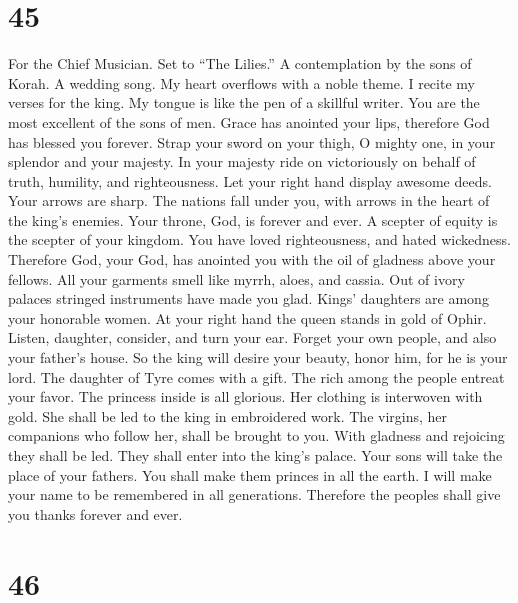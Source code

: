 \hypertarget{section-44}{%
\section{45}\label{section-44}}

For the Chief Musician. Set to ``The Lilies.'' A contemplation by the
sons of Korah. A wedding song.  My heart overflows with a
noble theme. I recite my verses for the king. My tongue is like the pen
of a skillful writer.  You are the most excellent of the
sons of men. Grace has anointed your lips, therefore God has blessed you
forever.  Strap your sword on your thigh, O mighty one, in
your splendor and your majesty.  In your majesty ride on
victoriously on behalf of truth, humility, and righteousness. Let your
right hand display awesome deeds.  Your arrows are sharp.
The nations fall under you, with arrows in the heart of the king's
enemies.  Your throne, God, is forever and ever. A scepter
of equity is the scepter of your kingdom.  You have loved
righteousness, and hated wickedness. Therefore God, your God, has
anointed you with the oil of gladness above your fellows. 
All your garments smell like myrrh, aloes, and cassia. Out of ivory
palaces stringed instruments have made you glad.  Kings'
daughters are among your honorable women. At your right hand the queen
stands in gold of Ophir.  Listen, daughter, consider, and
turn your ear. Forget your own people, and also your father's house.
 So the king will desire your beauty, honor him, for he
is your lord.  The daughter of Tyre comes with a gift.
The rich among the people entreat your favor.  The
princess inside is all glorious. Her clothing is interwoven with gold.
 She shall be led to the king in embroidered work. The
virgins, her companions who follow her, shall be brought to you.
 With gladness and rejoicing they shall be led. They
shall enter into the king's palace.  Your sons will take
the place of your fathers. You shall make them princes in all the earth.
 I will make your name to be remembered in all
generations. Therefore the peoples shall give you thanks forever and
ever.

\hypertarget{section-45}{%
\section{46}\label{section-45}}

